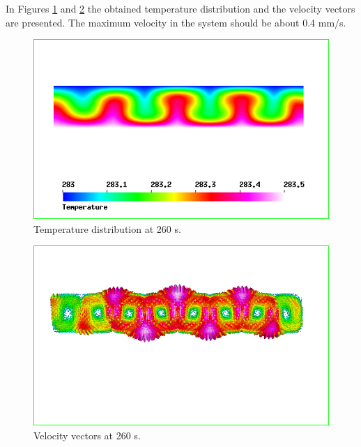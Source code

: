 In Figures \ref{fg:rb_temp} and \ref{fg:rb_vel} the obtained temperature 
distribution and the velocity vectors are presented. 
The maximum velocity in the system should be about 0.4 mm/s. 

\begin{figure}[h]
\centering
\includegraphics[width=150 mm, height=50 mm]{rb_temp}
\caption{Temperature distribution at 260 s.}\label{fg:rb_temp}
\end{figure} 

\begin{figure}[h]
\centering
\includegraphics[width=150 mm, height=70 mm]{rb_vel}
\caption{Velocity vectors at 260 s.}\label{fg:rb_vel}
\end{figure} 






